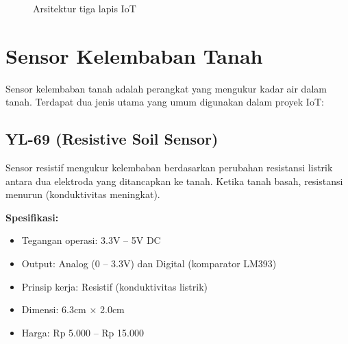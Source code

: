 \documentclass[12pt,a4paper,oneside]{report}
\begin{document}
\begin{figure}[H]
\centering
{}
\caption{Arsitektur tiga lapis IoT}
\label{fig:iot-arch}
\end{figure}

\section{Sensor Kelembaban Tanah}

Sensor kelembaban tanah adalah perangkat yang mengukur kadar air dalam tanah. Terdapat dua jenis utama yang umum digunakan dalam proyek IoT:

\subsection{YL-69 (Resistive Soil Sensor)}

Sensor resistif mengukur kelembaban berdasarkan perubahan resistansi listrik antara dua elektroda yang ditancapkan ke tanah. Ketika tanah basah, resistansi menurun (konduktivitas meningkat).

\textbf{Spesifikasi:}
\begin{itemize}
    \item Tegangan operasi: 3.3V -- 5V DC
    \item Output: Analog (0 -- 3.3V) dan Digital (komparator LM393)
    \item Prinsip kerja: Resistif (konduktivitas listrik)
    \item Dimensi: 6.3cm × 2.0cm
    \item Harga: Rp 5.000 -- Rp 15.000
\end{itemize}
\end{document}
